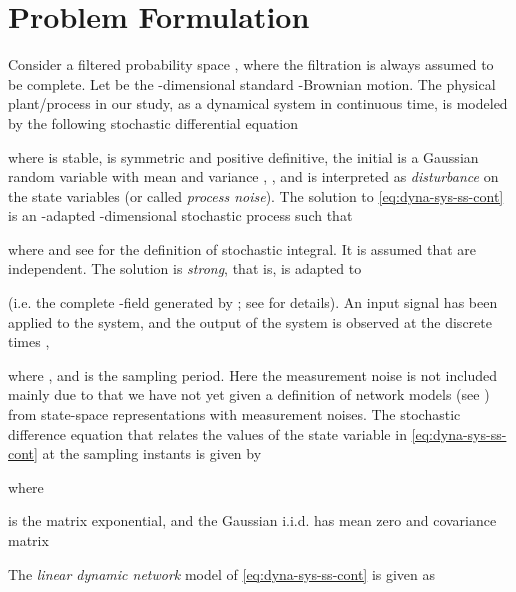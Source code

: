 \documentclass[letterpaper,10pt,journal,final]{IEEEtran}
\theoremstyle{definition}
\theoremstyle{remark}
\begin{document}
\section{Problem Formulation}
\label{sec:problem-formulation}

Consider a filtered probability space
, where the
filtration is always assumed to be complete.  Let  be the
-dimensional standard -Brownian motion.
The physical plant/process in our study, as a dynamical
system in continuous time, is modeled by the following stochastic differential
equation

where  is stable,  is
symmetric and positive definitive, the initial  is a
Gaussian random variable with mean  and variance , , and  is interpreted
as \emph{disturbance} on the state variables (or called \emph{process noise}).  The solution
to \eqref{eq:dyna-sys-ss-cont} is an -adapted -dimensional
stochastic process  such that

where  and see \cite{Gall2016} for the definition of
stochastic integral. It is assumed that  are independent. The solution
 is \emph{strong}, that is,  is adapted to

(i.e. the complete -field generated by ; see
\cite{Gall2016} for details).  An input signal  has been
applied to the system, and the output  of the system is observed at the discrete
times ,

where ,
 and  is the sampling period. Here the measurement
noise is not included mainly due to that we have not yet given a definition of
network models (see \cite{Goncalves2008}) from state-space representations with
measurement noises.  The stochastic difference equation that relates the values of
the state variable  in \eqref{eq:dyna-sys-ss-cont} at the sampling
instants\cite[p.~82-85]{Astrom2012}\cite[chap.~2]{Garnier2008} is given by

where

 is the matrix exponential, and the Gaussian i.i.d.  has mean zero
and covariance matrix




The \emph{linear dynamic network} model of \eqref{eq:dyna-sys-ss-cont} is given as
\end{document}
